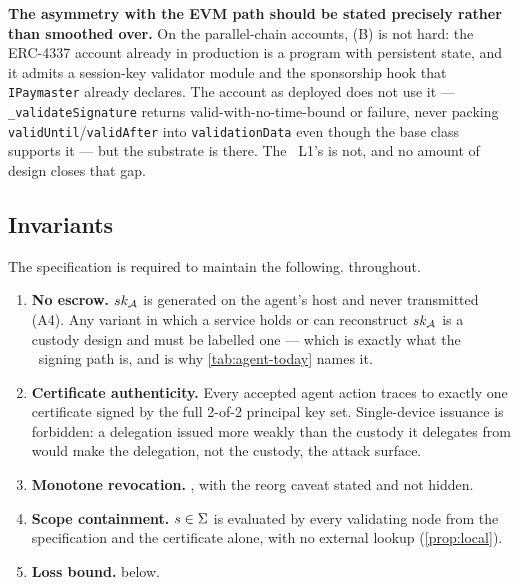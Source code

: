\textbf{The asymmetry with the EVM path should be stated precisely rather than smoothed over.} On the
parallel-chain accounts, (B) is not hard: the ERC-4337 account already in production is a program
with persistent state, and it admits a session-key validator module and the sponsorship hook that
\texttt{IPaymaster} already declares. The account as deployed does not use it --- \texttt{\_validate\allowbreak{}Signature}
returns valid-with-no-time-bound or failure, never packing \texttt{validUntil}\slash\texttt{validAfter} into
\texttt{validationData} even though the base class supports it
 --- but the substrate is
there. The \Flux\ L1's is not, and no amount of design closes that gap.

\subsection{Invariants}
\label{sec:agent-identity:invariants}

The specification is required to maintain the following. \planned throughout.

\begin{enumerate}
  \item \textbf{No escrow.} $sk_{\mathcal{A}}$ is generated on the agent's host and never transmitted
  (A4). Any variant in which a service holds or can reconstruct $sk_{\mathcal{A}}$ is a custody design and
  must be labelled one --- which is exactly what the \FluxCore\ signing path is, and is why
  \cref{tab:agent-today} names it.
  \item \textbf{Certificate authenticity.} Every accepted agent action traces to exactly one
  certificate signed by the full 2-of-2 principal key set. Single-device issuance is forbidden:
  a delegation issued more weakly than the custody it delegates from would make the delegation, not
  the custody, the attack surface.
  \item \textbf{Monotone revocation.} , with the reorg caveat stated and not
  hidden.
  \item \textbf{Scope containment.} $s \in \Sigma$ is evaluated by every validating node from the
  specification and the certificate alone, with no external lookup (\cref{prop:local}).
  \item \textbf{Loss bound.}  below.
\end{enumerate}

